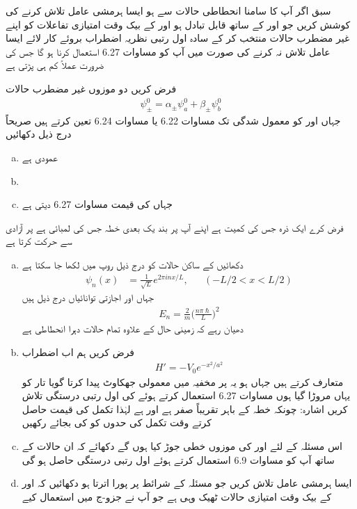 سبق  اگر آپ کا سامنا انحطاطی حالات سے ہو ایسا ہرمشی عامل  تلاش کرنے کی کوشش کریں جو  اور  کے ساتھ قابل تبادل ہو  اور  کے بیک وقت امتیازی تفاعلات کو اپنے غیر مضطرب حالات منتخب کر کے سادہ اول رتبی نظریہ اضطراب بروئے کار لائے ایسا عامل تلاش نہ کرنے کی صورت میں آپ کو مساوات 6.27 استعمال کرنا ہو گا جس کی ضرورت عملاً  کم ہی پڑتی ہے 


فرض کریں  دو موزوں غیر مضطرب حالات
\begin{align*}
\psi_\pm^0 = \alpha_\pm \psi_a^0 + \beta_\pm \psi_b^0
\end{align*}
جہاں  اور  کو معمول شدگی تک مساوات 6.22 یا مساوات 6.24 تعین کرتے ہیں  صریحاً  درج ذیل دکھائیں 
\begin{enumerate}[a.]
\item
{} عمودی ہے   
\item
{} 
\item
{} جہاں  کی قیمت مساوات 6.27 دیتی ہے 
\end{enumerate}
فرض کرے ایک ذرہ جس کی کمیت  ہے اپنے آپ پر بند یک بعدی خطہ جس کی لمبائی  ہے پر آزادی سے حرکت کرتا ہے 
\begin{enumerate}[a.]
\item
دکھائیں کے ساکن حالات کو درج ذیل روپ میں لکھا جا سکتا ہے 
 \begin{align*}
\psi_n (x) &= \frac{1}{\sqrt{L}} e^{2 \pi i n x/ L}, &&(-L/2 < x < L/2)
\end{align*}
جہاں  اور اجازتی توانائیاں درج ذیل ہیں 
\begin{align*}
E_n = \frac{2}{m} \big ( \frac{n \pi \hslash}{L} \big )^2
\end{align*}
دھیان رہے کہ زمینی حال  کے علاوہ تمام حالات دہرا انحطاطی ہے 
\item
فرض کریں ہم اب اضطراب 
\begin{align*}
H' = -V_0 e^{-x^2 / a^2}
\end{align*}
متعارف کرتے ہیں جہاں  ہو یہ  پر مخفیہ میں معمولی جھکاوٹ پیدا کرتا گویا تار کو یہاں مروڑا گیا ہوں مساوات 6.27 استعمال کرتے ہوئے  کی اول رتبی درستگی تلاش کریں اشارہ: چونکہ  خطہ  کے باہر تقریباً  صفر ہے اور  ہے لہٰذا تکمل کی قیمت حاصل کرتے وقت تکمل کی حدوں کو  کی بجائے   رکھیں 
\item
اس مسئلہ کے لئے  اور  کی موزوں خطی جوڑ کیا ہوں گے دکھائے کہ ان حالات کے ساتھ آپ کو مساوات 6.9 استعمال کرتے ہوئے اول رتبی درستگی حاصل ہو گی 
\item
ایسا ہرمشی عامل  تلاش کریں جو مسئلہ کے شرائط پر پورا اترتا ہو دکھائیں کہ  اور  کے بیک وقت امتیازی حالات ٹھیک وہی ہے  جو آپ نے جزو-ج میں استعمال کیے 
\end{enumerate}

